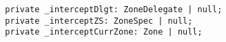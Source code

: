 \begin{verbatim}
  private _interceptDlgt: ZoneDelegate | null;
  private _interceptZS: ZoneSpec | null;
  private _interceptCurrZone: Zone | null;
\end{verbatim}
